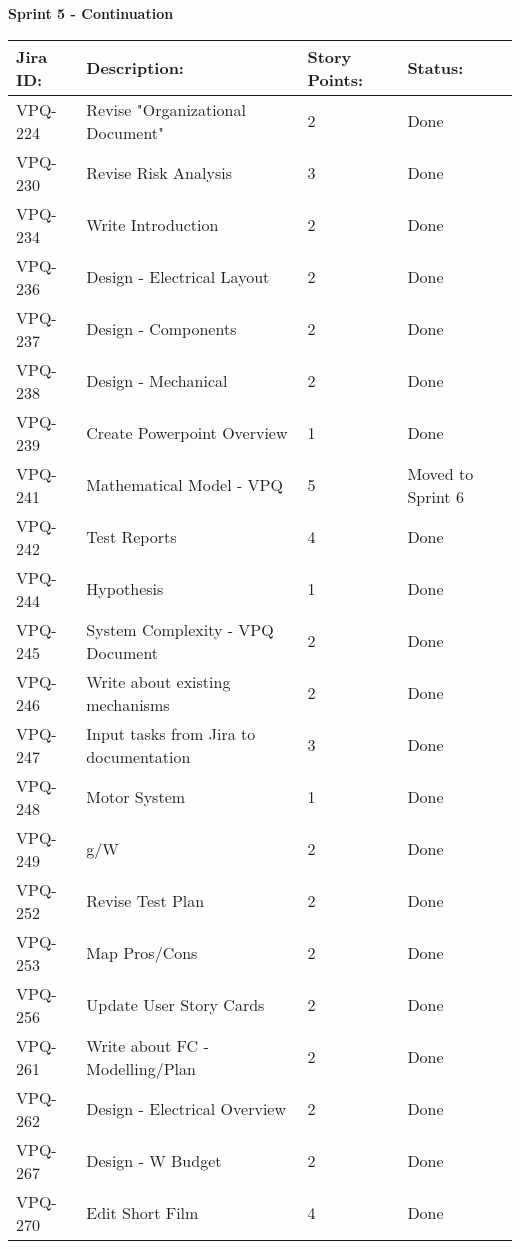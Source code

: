 \begin{table}[ht]
\centering\textbf{Sprint 5 - Continuation}
\begin{tabularx}{\linewidth}{|m{1.5cm} m{8.3cm} m{1.5cm} m{3.5cm}|}
\hline
    \rowcolor{cadetgrey} 
     \textbf{Jira ID:} & \textbf{Description:} &  \textbf{Story Points:} & \textbf{Status: } \\ \hline
      VPQ-224 & Revise "Organizational Document" & 2\centering & Done  \\
\rowcolor{gainsboro} VPQ-230 & Revise Risk Analysis & 3\centering & Done  \\    
      VPQ-234 & Write Introduction & 2\centering & Done  \\
\rowcolor{gainsboro}  VPQ-236 & Design - Electrical Layout & 2\centering & Done  \\
      VPQ-237 & Design - Components & 2\centering & Done \\
\rowcolor{gainsboro}  VPQ-238 & Design - Mechanical & 2\centering & Done  \\
      VPQ-239 & Create Powerpoint Overview & 1\centering & Done  \\
\rowcolor{gainsboro}  VPQ-241 & Mathematical Model - VPQ & 5\centering & Moved to Sprint 6  \\
      VPQ-242 & Test Reports & 4\centering & Done \\
\rowcolor{gainsboro}  VPQ-244 & Hypothesis & 1\centering & Done  \\
      VPQ-245 & System Complexity - VPQ Document & 2\centering & Done  \\
\rowcolor{gainsboro}  VPQ-246 & Write about existing mechanisms & 2\centering & Done  \\
      VPQ-247 & Input tasks from Jira to documentation & 3\centering & Done  \\
\rowcolor{gainsboro}  VPQ-248 & Motor System & 1\centering & Done  \\
      VPQ-249 & g/W & 2\centering & Done \\
\rowcolor{gainsboro}  VPQ-252 & Revise Test Plan & 2\centering & Done  \\
      VPQ-253 & Map Pros/Cons & 2\centering & Done  \\
\rowcolor{gainsboro}  VPQ-256 & Update User Story Cards & 2\centering & Done  \\
      VPQ-261 & Write about FC - Modelling/Plan & 2\centering & Done  \\
\rowcolor{gainsboro}  VPQ-262 & Design - Electrical Overview & 2\centering & Done  \\
      VPQ-267 & Design - W Budget & 2\centering & Done  \\
\rowcolor{gainsboro}  VPQ-270 & Edit Short Film & 4\centering & Done  \\

\hline    
\end{tabularx}
\end{table}



